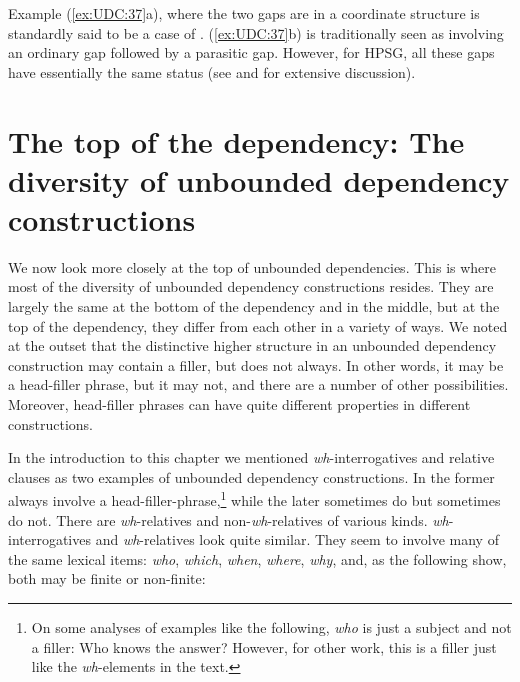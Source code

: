 \documentclass[output=paper
,notxmath 
	        ,collection
	        ,collectionchapter
 	        ,biblatex
                ,babelshorthands
                ,newtxmath
                ,draftmode
                ,colorlinks, citecolor=brown
]{langscibook}
\begin{document}
\noindent
Example (\ref{ex:UDC:37}a), where the two gaps are in a coordinate structure
is standardly said to be a case of . (\ref{ex:UDC:37}b) is traditionally seen as involving an
ordinary gap followed by a parasitic gap. However, for HPSG, all these
gaps have essentially the same status (see \citealt{Levine:Hukari:06}
and \citealt{Chaves:12} for extensive discussion).

\section{The top of the dependency: The diversity of unbounded
dependency constructions}
\label{sec:UDC:Top}

We now look more closely at the top of unbounded dependencies. This is
where most of the diversity of unbounded dependency constructions
resides. They are largely the same at the bottom of the dependency and
in the middle, but at the top of the dependency, they differ from each
other in a variety of ways. We noted at the outset that the
distinctive higher structure in an unbounded dependency construction
may contain a filler, but does not always. In other words, it may be a
head-filler phrase, but it may not, and there are a number of other
possibilities. Moreover, head-filler phrases can have quite different
properties in different constructions.

In the introduction to this chapter we mentioned
\emph{wh}-interrogatives and relative clauses as two examples of
unbounded dependency constructions. In  the former always involve
a head-filler-phrase,\footnote{On some analyses of examples like the
  following, \emph{who} is just a subject and not a filler:
\ea
Who knows the answer?
\z
However, for other work, this is a filler just like the
  \emph{wh}-elements in the text.} while the later sometimes do but
sometimes do not. There are \emph{wh}-relatives and
non-\emph{wh}-relatives of various kinds. 
\emph{wh}-interrogatives and \emph{wh}-relatives look quite similar.
They seem to involve many of the same lexical items: \emph{who},
\emph{which}, \emph{when}, \emph{where}, \emph{why}, and, as the
following show, both may be finite or non-finite:

\eal
\label{ex:UDC:38}

\zl

\eal
\label{ex:UDC:39}
\zl
\end{document}
